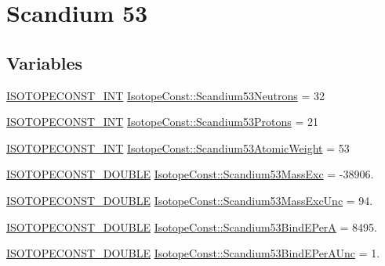 \hypertarget{group___isotope_const-_scandium-_sc53}{}\section{Scandium 53}
\label{group___isotope_const-_scandium-_sc53}
\subsection*{Variables}
\begin{DoxyCompactItemize}
\item 
\mbox{\hyperlink{group___isotope_const-_macros_ga5f18360b3e99483a35c32d789e62621c}{I\+S\+O\+T\+O\+P\+E\+C\+O\+N\+S\+T\+\_\+\+I\+NT}} \mbox{\hyperlink{group___isotope_const-_scandium-_sc53_gab5e5ebf742e9b94204028d866c14fe79}{Isotope\+Const\+::\+Scandium53\+Neutrons}} = 32
\item 
\mbox{\hyperlink{group___isotope_const-_macros_ga5f18360b3e99483a35c32d789e62621c}{I\+S\+O\+T\+O\+P\+E\+C\+O\+N\+S\+T\+\_\+\+I\+NT}} \mbox{\hyperlink{group___isotope_const-_scandium-_sc53_gab24b55b86e57e4002ee8656103c43815}{Isotope\+Const\+::\+Scandium53\+Protons}} = 21
\item 
\mbox{\hyperlink{group___isotope_const-_macros_ga5f18360b3e99483a35c32d789e62621c}{I\+S\+O\+T\+O\+P\+E\+C\+O\+N\+S\+T\+\_\+\+I\+NT}} \mbox{\hyperlink{group___isotope_const-_scandium-_sc53_gaa16c3d6d1aa03bea88e16e4d06de861f}{Isotope\+Const\+::\+Scandium53\+Atomic\+Weight}} = 53
\item 
\mbox{\hyperlink{group___isotope_const-_macros_ga8f45a7272ce02c0b4c65c44636ed719a}{I\+S\+O\+T\+O\+P\+E\+C\+O\+N\+S\+T\+\_\+\+D\+O\+U\+B\+LE}} \mbox{\hyperlink{group___isotope_const-_scandium-_sc53_gac8ce3cd76824d3435c18901d16b0dded}{Isotope\+Const\+::\+Scandium53\+Mass\+Exc}} = -\/38906.
\item 
\mbox{\hyperlink{group___isotope_const-_macros_ga8f45a7272ce02c0b4c65c44636ed719a}{I\+S\+O\+T\+O\+P\+E\+C\+O\+N\+S\+T\+\_\+\+D\+O\+U\+B\+LE}} \mbox{\hyperlink{group___isotope_const-_scandium-_sc53_ga0334fd9b0a05a20b013446ac58de66b2}{Isotope\+Const\+::\+Scandium53\+Mass\+Exc\+Unc}} = 94.
\item 
\mbox{\hyperlink{group___isotope_const-_macros_ga8f45a7272ce02c0b4c65c44636ed719a}{I\+S\+O\+T\+O\+P\+E\+C\+O\+N\+S\+T\+\_\+\+D\+O\+U\+B\+LE}} \mbox{\hyperlink{group___isotope_const-_scandium-_sc53_gab87f12e1763adbe17fbbaf9770123209}{Isotope\+Const\+::\+Scandium53\+Bind\+E\+PerA}} = 8495.
\item 
\mbox{\hyperlink{group___isotope_const-_macros_ga8f45a7272ce02c0b4c65c44636ed719a}{I\+S\+O\+T\+O\+P\+E\+C\+O\+N\+S\+T\+\_\+\+D\+O\+U\+B\+LE}} \mbox{\hyperlink{group___isotope_const-_scandium-_sc53_ga0b7cbdf53bab617c307c78e59d92be5f}{Isotope\+Const\+::\+Scandium53\+Bind\+E\+Per\+A\+Unc}} = 1.

\end{DoxyCompactItemize}
